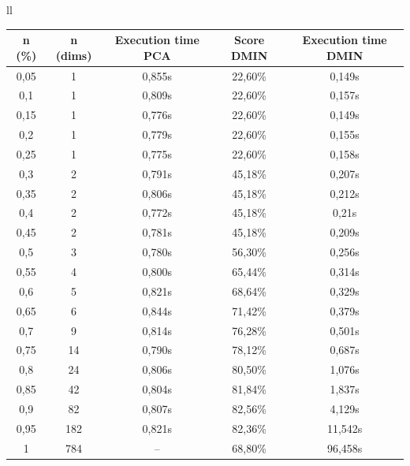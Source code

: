 \documentclass[12pt,a4paper]{article}
\begin{document}
{\begin{tabular}{ll}
    \sffamily\small
	\begin{tabular}{|c|c|c|c|c|}
        \hline
        \tiny n (\%) & \tiny n (dims) & \tiny Execution time PCA & \tiny Score DMIN & \tiny Execution time DMIN \\
        \hline
        0,05         & 1              & 0,855s                   & 22,60\%          & 0,149s     \\
        0,1          & 1              & 0,809s                   & 22,60\%          & 0,157s     \\
        0,15         & 1              & 0,776s                   & 22,60\%          & 0,149s     \\
        0,2          & 1              & 0,779s                   & 22,60\%          & 0,155s     \\
        0,25         & 1              & 0,775s                   & 22,60\%          & 0,158s     \\
        0,3          & 2              & 0,791s                   & 45,18\%          & 0,207s     \\
        0,35         & 2              & 0,806s                   & 45,18\%          & 0,212s     \\
        0,4          & 2              & 0,772s                   & 45,18\%          & 0,21s      \\
        0,45         & 2              & 0,781s                   & 45,18\%          & 0,209s     \\
        0,5          & 3              & 0,780s                   & 56,30\%          & 0,256s     \\
        0,55         & 4              & 0,800s                   & 65,44\%          & 0,314s     \\
        0,6          & 5              & 0,821s                   & 68,64\%          & 0,329s     \\
        0,65         & 6              & 0,844s                   & 71,42\%          & 0,379s     \\
        0,7          & 9              & 0,814s                   & 76,28\%          & 0,501s     \\
        0,75         & 14             & 0,790s                   & 78,12\%          & 0,687s     \\
        0,8          & 24             & 0,806s                   & 80,50\%          & 1,076s     \\
        0,85         & 42             & 0,804s                   & 81,84\%          & 1,837s     \\
        0,9          & 82             & 0,807s                   & 82,56\%          & 4,129s     \\
        0,95         & 182            & 0,821s                   & 82,36\%          & 11,542s    \\
        1            & 784            & --                       & 68,80\%          & 96,458s    \\
        \hline
    \end{tabular}


\end{tabular}}
\end{document}
